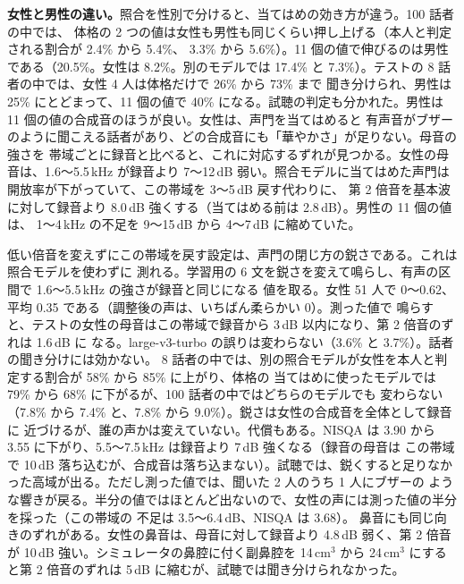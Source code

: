 \documentclass[10pt,a4paper,twocolumn]{article}
\begin{document}
\textbf{女性と男性の違い。}照合を性別で分けると、当てはめの効き方が違う。100 話者の中では、
体格の 2 つの値は女性も男性も同じくらい押し上げる（本人と判定される割合が 2.4\% から 5.4\%、
3.3\% から 5.6\%）。11 個の値で伸びるのは男性である（20.5\%。女性は 8.2\%。別のモデルでは
17.4\% と 7.3\%）。テストの 8 話者の中では、女性 4 人は体格だけで 26\% から 73\% まで
聞き分けられ、男性は 25\% にとどまって、11 個の値で 40\% になる。試聴の判定も分かれた。男性は 11 個の値の合成音のほうが良い。女性は、声門を当てはめると
有声音がブザーのように聞こえる話者があり、どの合成音にも「華やかさ」が足りない。母音の強さを
帯域ごとに録音と比べると、これに対応するずれが見つかる。女性の母音は、1.6〜5.5\,kHz が録音より
7〜12\,dB 弱い。照合モデルに当てはめた声門は開放率が下がっていて、この帯域を 3〜5\,dB 戻す代わりに、
第 2 倍音を基本波に対して録音より 8.0\,dB 強くする（当てはめる前は 2.8\,dB）。男性の 11 個の値は、
1〜4\,kHz の不足を 9〜15\,dB から 4〜7\,dB に縮めていた。

低い倍音を変えずにこの帯域を戻す設定は、声門の閉じ方の鋭さである。これは照合モデルを使わずに
測れる。学習用の 6 文を鋭さを変えて鳴らし、有声の区間で 1.6〜5.5\,kHz の強さが録音と同じになる
値を取る。女性 51 人で 0〜0.62、平均 0.35 である（調整後の声は、いちばん柔らかい 0）。測った値で
鳴らすと、テストの女性の母音はこの帯域で録音から 3\,dB 以内になり、第 2 倍音のずれは 1.6\,dB に
なる。large-v3-turbo の誤りは変わらない（3.6\% と 3.7\%）。話者の聞き分けには効かない。
8 話者の中では、別の照合モデルが女性を本人と判定する割合が 58\% から 85\% に上がり、体格の
当てはめに使ったモデルでは 79\% から 68\% に下がるが、100 話者の中ではどちらのモデルでも
変わらない（7.8\% から 7.4\% と、7.8\% から 9.0\%）。鋭さは女性の合成音を全体として録音に
近づけるが、誰の声かは変えていない。代償もある。NISQA は 3.90 から 3.55 に下がり、5.5〜7.5\,kHz は録音より 7\,dB 強くなる（録音の母音は
この帯域で 10\,dB 落ち込むが、合成音は落ち込まない）。試聴では、鋭くすると足りなかった高域が出る。ただし測った値では、聞いた 2 人のうち 1 人にブザーの
ような響きが戻る。半分の値ではほとんど出ないので、女性の声には測った値の半分を採った（この帯域の
不足は 3.5〜6.4\,dB、NISQA は 3.68）。
鼻音にも同じ向きのずれがある。女性の鼻音は、母音に対して録音より 4.8\,dB 弱く、第 2 倍音が
10\,dB 強い。シミュレータの鼻腔に付く副鼻腔を 14\,cm$^3$ から 24\,cm$^3$ にすると第 2 倍音のずれは
5\,dB に縮むが、試聴では聞き分けられなかった。
\end{document}
